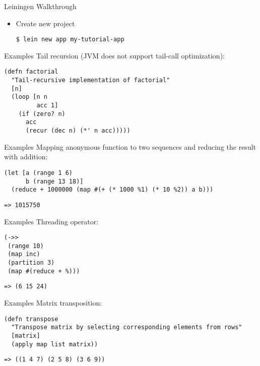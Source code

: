 \documentclass[pdf]{beamer}
\begin{document}
\begin{frame}[fragile]{Leiningen Walkthrough}
  \begin{itemize}
    \pause
  \item Create new project
\begin{verbatim}
$ lein new app my-tutorial-app
\end{verbatim}
  \end{itemize}
  
\end{frame}


\begin{frame}[fragile]{Examples}
  Tail recursion (JVM does not support tail-call optimization):
  \pause
\begin{verbatim}
(defn factorial
  "Tail-recursive implementation of factorial"
  [n]
  (loop [n n
         acc 1]
    (if (zero? n)
      acc
      (recur (dec n) (*' n acc)))))
\end{verbatim}
\end{frame}

\begin{frame}[fragile]{Examples}
  Mapping anonymous function to two sequences and reducing the result with addition:
  \pause
\begin{verbatim}
(let [a (range 1 6)
      b (range 13 18)]
  (reduce + 1000000 (map #(+ (* 1000 %1) (* 10 %2)) a b)))
\end{verbatim}
  \pause
\begin{verbatim}
=> 1015750
\end{verbatim}
\end{frame}

\begin{frame}[fragile]{Examples}
  Threading operator:
  \pause
\begin{verbatim}
(->>
 (range 10)
 (map inc)
 (partition 3)
 (map #(reduce + %)))
\end{verbatim}
  \pause
\begin{verbatim}
=> (6 15 24)
\end{verbatim}
\end{frame}

\begin{frame}[fragile]{Examples}
  Matrix transposition:
  \pause
\begin{verbatim}
(defn transpose
  "Transpose matrix by selecting corresponding elements from rows"
  [matrix]
  (apply map list matrix))
\end{verbatim}
  \pause
\begin{verbatim}
=> ((1 4 7) (2 5 8) (3 6 9))
\end{verbatim}
\end{frame}
\end{document}
